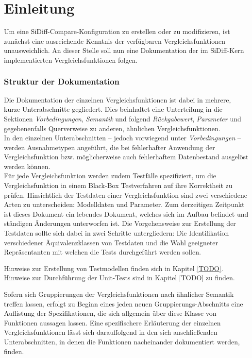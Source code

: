 %
%

\chapter{Einleitung}
\label{strct:intro}

Um eine SiDiff-Compare-Konfiguration zu erstellen oder zu modifizieren, ist zunächst eine ausreichende Kenntnis der verfügbaren Vergleichsfunktionen unausweichlich. An dieser Stelle soll nun eine Dokumentation der im SiDiff-Kern implementierten Vergleichsfunktionen folgen.

\subsection*{Struktur der Dokumentation}
Die Dokumentation der einzelnen Vergleichsfunktionen ist dabei in mehrere, kurze Unterabschnitte gegliedert. Dies beinhaltet eine Unterteilung in die Sektionen \emph{Vorbedingungen}, \emph{Semantik} und folgend \emph{Rückgabewert}, \emph{Parameter} und gegebenenfalls Querverweise zu anderen, ähnlichen Vergleichsfunktionen.\\
In den einzelnen Unterabschnitten -- jedoch vorwiegend unter \emph{Vorbedingungen} -- werden Ausnahmetypen angeführt, die bei fehlerhafter Anwendung der Vergleichsfunktion bzw. möglicherweise auch fehlerhaftem Datenbestand ausgelöst werden können.\\
Für jede Vergleichsfunktion werden zudem Testfälle spezifiziert, um die Vergleichsfunktion in einem Black-Box Testverfahren auf ihre Korrektheit zu prüfen. Hinsichtlich der Testdaten einer Vergleichsfunktion sind zwei verschiedene Arten zu unterscheiden: Modelldaten und Parameter. Zum derzeitigen Zeitpunkt ist dieses Dokument ein lebendes Dokument, welches sich im Aufbau befindet und ständigen Änderungen unterworfen ist. Die Vorgehensweise zur Erstellung der Testdaten sollte sich dabei in zwei Schritte untergliedern: Die Identifikation verschiedener Äquivalenzklassen von Testdaten und die Wahl geeigneter Repräsentanten mit welchen die Tests durchgeführt werden sollen.

Hinweise zur Erstellung von Testmodellen finden sich in Kapitel \ref{TODO}. Hinweise zur Durchführung der Unit-Tests sind in Kapitel \ref{TODO} zu finden.

Sofern sich Gruppierungen der Vergleichsfunktionen nach ähnlicher Semantik treffen lassen, erfolgt zu Beginn eines jeden neuen Gruppierungs-Abschnitts eine Auflistung der Spezifikationen, die sich allgemein über diese Klasse von Funktionen aussagen lassen. Eine spezifischere Erläuterung der einzelnen Vergleichsfunktionen lässt sich darauffolgend in den sich anschließenden Unterabschnitten, in denen die Funktionen nacheinander dokumentiert werden, finden.
